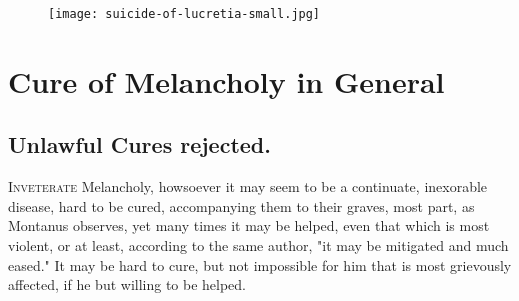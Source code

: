 \cleartoleftpage{}
\begin{figure}[p]
  \begingroup
  \centering
  \texttt{[image: suicide-of-lucretia-small.jpg]}
  \label{fig:suicideoflucretia}
\end{figure}
\clearpage{}
\thispagestyle{titleontop}
\chapter{Cure of Melancholy in General}
{
\section{Unlawful Cures rejected.}
\lettrine[lines=3]{I}{nveterate} Melancholy, howsoever it may seem to be a
continuate, inexorable disease, hard to be cured, accompanying them to their
graves, most part, as Montanus observes, yet many times it
may be helped, even that which is most violent, or at least, according to the
same author, "it may be mitigated and much eased."  It may be hard to cure, but not impossible for him that is most
grievously affected, if he but willing to be helped.

}
